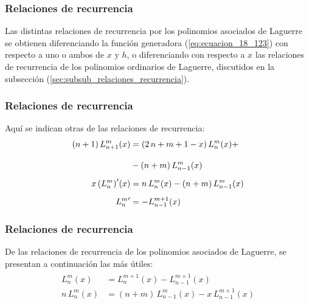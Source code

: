 \documentclass[12pt]{beamer}
\begin{document}
\begin{frame}
\frametitle{Relaciones de recurrencia}
Las distintas relaciones de recurrencia por los polinomios asociados de Laguerre se obtienen diferenciando la función generadora (\ref{eq:ecuacion_18_123}) con respecto a uno o ambos de $x$ y $h$, o diferenciando con respecto a $x$ las relaciones de recurrencia de los polinomios ordinarios de Laguerre, discutidos en la subsección (\ref{sec:subsub_relaciones_recurrencia}).
\end{frame}
\begin{frame}
\frametitle{Relaciones de recurrencia}
Aquí se indican otras de las relaciones de recurrencia:
\pause
\begin{eqnarray*}
\begin{aligned}
(n + 1) \, L_{n+1}^{m} (x) &= (2 \, n + m + 1 - x) \, L_{n}^{m} (x) + \\[1em] \nonumber
&- (n + m) \, L_{n-1}^{m} (x) \label{eq:ecuacion_18_124} \\[0.5em]
x \, {(L_{n}^{m})}^{\prime} (x) &= n \, L_{n}^{m} (x) - (n + m) \, L_{n-1}^{m} (x) \label{eq:ecuacion_18_125} \\[0.5em]
{L_{n}^{m}}^{\prime} &= - L_{n-1}^{m+1} (x) \label{eq:ecuacion_18_125a}
\end{aligned}
\end{eqnarray*}
\end{frame}
\begin{frame}
\frametitle{Relaciones de recurrencia}
De las relaciones de recurrencia de los polinomios asociados de Laguerre, se presentan a continuación las más útiles:
\pause
\begin{eqnarray*}
\begin{aligned}
L_{n}^{m} (x) &= L_{n}^{m+1} (x) - L_{n-1}^{m+1} (x) \label{eq:ecuacion_18_125b} \\[0.5em]
n \, L_{n}^{m} (x) &= (n + m) \, L_{n-1}^{m} (x) - x \, L_{n-1}^{m+1} (x) \label{eq:ecuacion_18_125c}
\end{aligned}
\end{eqnarray*}
\end{frame}


\end{document}
